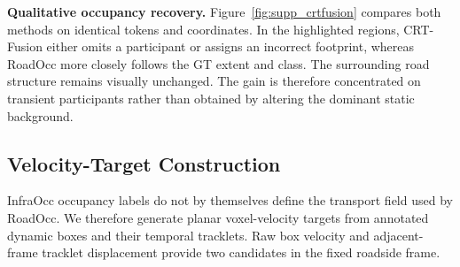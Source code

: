 \noindent\textbf{Qualitative occupancy recovery.}
Figure~\ref{fig:supp_crtfusion} compares both methods on identical tokens and
coordinates. In the highlighted regions, CRT-Fusion either omits a participant
or assigns an incorrect footprint, whereas RoadOcc more closely follows the GT
extent and class. The surrounding road structure remains visually unchanged.
The gain is therefore concentrated on transient participants rather than
obtained by altering the dominant static background.

\subsection{Velocity-Target Construction}
\label{sec:velocity_target_contract}

InfraOcc occupancy labels do not by themselves define the transport field used
by RoadOcc. We therefore generate planar voxel-velocity targets from annotated
dynamic boxes and their temporal tracklets. Raw box velocity and adjacent-frame
tracklet displacement provide two candidates in the fixed roadside frame.

